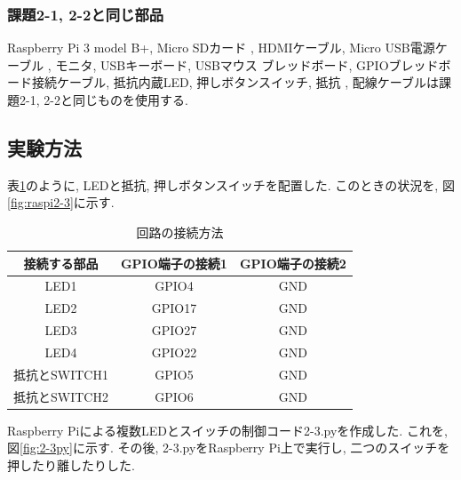 \documentclass{ltjsarticle} %
\begin{document}
\subsubsection{課題2-1, 2-2と同じ部品}
Raspberry Pi 3 model B+, Micro SDカード
, HDMIケーブル, Micro USB電源ケーブル
, モニタ, USBキーボード, USBマウス
ブレッドボード, GPIOブレッドボード接続ケーブル, 抵抗内蔵LED, 押しボタンスイッチ, 抵抗
, 配線ケーブルは課題2-1, 2-2と同じものを使用する. 



\subsection{実験方法}

表\ref{tab:tab2-3}のように, LEDと抵抗, 押しボタンスイッチを配置した.
このときの状況を, 図\ref{fig:raspi2-3}に示す. 

\begin{table}[H] %
  \centering %
  \caption{回路の接続方法}
  \begin{tabular}{|c|c|c|} 
  \hline %
  接続する部品 & GPIO端子の接続1 & GPIO端子の接続2 \\ \hline %
  LED1 & GPIO4  & GND \\ \hline
  LED2 & GPIO17 & GND \\ \hline
  LED3 & GPIO27 & GND \\ \hline
  LED4 & GPIO22 & GND \\ \hline
  抵抗とSWITCH1 & GPIO5 & GND \\ \hline
  抵抗とSWITCH2 & GPIO6 & GND \\ \hline

  \end{tabular}
  \label{tab:tab2-3} %
\end{table}

Raspberry Piによる複数LEDとスイッチの制御コード2-3.pyを作成した. これを, 図\ref{fig:2-3py}に示す.
その後, 2-3.pyをRaspberry Pi上で実行し, 二つのスイッチを押したり離したりした.
\end{document}
